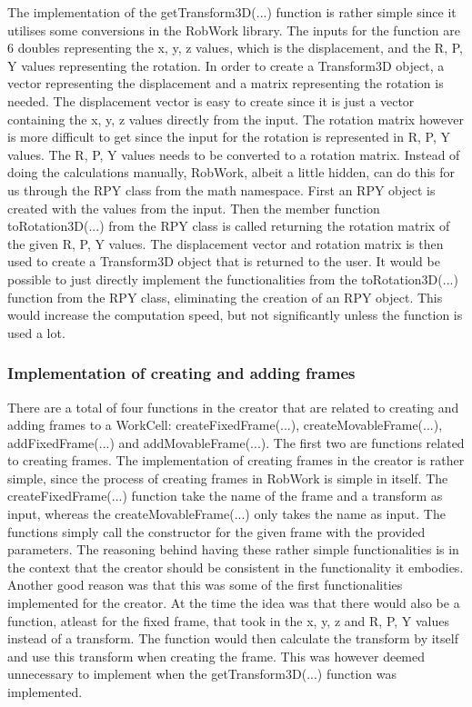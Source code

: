The implementation of the getTransform3D(...) function is rather simple since it utilises some conversions in the RobWork library. The inputs for the function are 6 doubles representing the x, y, z values, which is the displacement, and the R, P, Y values representing the rotation. In order to create a Transform3D object, a vector representing the displacement and a matrix representing the rotation is needed. The displacement vector is easy to create since it is just a vector containing the x, y, z values directly from the input. The rotation matrix however is more difficult to get since the input for the rotation is represented in R, P, Y values. The R, P, Y values needs to be converted to a rotation matrix. Instead of doing the calculations manually, RobWork, albeit a little hidden, can do this for us through the RPY class from the math namespace. First an RPY object is created with the values from the input. Then the member function toRotation3D(...) from the RPY class is called returning the rotation matrix of the given R, P, Y values. The displacement vector and rotation matrix is then used to create a Transform3D object that is returned to the user. It would be possible to just directly implement the functionalities from the toRotation3D(...) function from the RPY class, eliminating the creation of an RPY object. This would increase the computation speed, but not significantly unless the function is used a lot.

\subsubsection{Implementation of creating and adding frames}
There are a total of four functions in the creator that are related to creating and adding frames to a WorkCell: createFixedFrame(...), createMovableFrame(...), addFixedFrame(...) and addMovableFrame(...). The first two are functions related to creating frames. The implementation of creating frames in the creator is rather simple, since the process of creating frames in RobWork is simple in itself. The createFixedFrame(...) function take the name of the frame and a transform as input, whereas the createMovableFrame(...) only takes the name as input. The functions simply call the constructor for the given frame with the provided parameters. The reasoning behind having these rather simple functionalities is in the context that the creator should be consistent in the functionality it embodies. Another good reason was that this was some of the first functionalities implemented for the creator. At the time the idea was that there would also be a function, atleast for the fixed frame, that took in the x, y, z and R, P, Y values instead of a transform. The function would then calculate the transform by itself and use this transform when creating the frame. This was however deemed unnecessary to implement when the getTransform3D(...) function was implemented.\\

